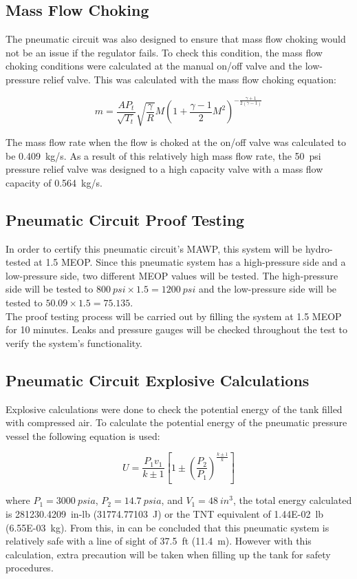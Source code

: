 \documentclass[main.tex]{subfiles}
\begin{document}
  \subsection{Mass Flow Choking}
The pneumatic circuit was also designed to ensure that mass flow choking would not be an issue if the regulator fails. To check this condition, the mass flow choking conditions were calculated at the manual on/off valve and the low-pressure relief valve. This was calculated with the mass flow choking equation:\\
\begin{center}
        \[
        {m} = \frac{AP_t}{\sqrt{T_t}} \sqrt{\frac{\gamma}{R}}M(1+\frac{\gamma-1}{2}{M^2})^{-\frac{\gamma+1}{2(\gamma-1)}}
        \]
	\end{center}

The mass flow rate when the flow is choked at the on/off valve was calculated to be \SI{0.409}{kg/s}.
As a result of this relatively high mass flow rate, the \SI{50}{psi} pressure relief valve was designed to a high capacity valve with a mass flow capacity of \SI{0.564}{kg/s}.\\

    \subsection{Pneumatic Circuit Proof Testing}
    In order to certify this pneumatic circuit's MAWP, this system will be hydro-tested at 1.5 MEOP. Since this pneumatic system has a high-pressure side and a low-pressure side, two different MEOP values will be tested. The high-pressure side will be tested to $\SI{800}{psi}\times 1.5=\SI{1200}{psi}$ and the low-pressure side will be tested to $50.09 \times 1.5=75.135$.\\
    The proof testing process will be carried out by filling the system at 1.5 MEOP for 10 minutes. Leaks and pressure gauges will be checked throughout the test to verify the system's functionality.\\

     \subsection{Pneumatic Circuit Explosive Calculations}
     \label{section:pneumatics}
    Explosive calculations were done to check the potential energy of the tank filled with compressed air. To calculate the potential energy of the pneumatic pressure vessel the following equation is used:\\
    \begin{center}
        \[
        U = \frac{P_1 v_1}{k\pm{1}} [1\pm(\frac{P_2}{P_1})^ \frac{k\pm{1}}{k}]
        \]
	\end{center}
	where ${P_1}=\SI{3000}{psia}$, ${P_2}=\SI{14.7}{psia}$, and ${V_1}=\SI{48}{in^3}$, the total energy calculated is \SI{281230.4209}{in}-lb (\SI{31774.77103}{J}) or the  TNT equivalent of \SI{1.44E-02}{lb} (\SI{6.55E-03}{kg}). From this, in can be concluded that this pneumatic system is relatively safe with a line of sight of \SI{37.5}{ft} (\SI{11.4}{m}). However with this calculation, extra precaution will be taken when filling up the tank for safety procedures.
\end{document}
